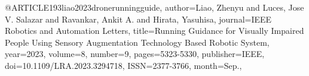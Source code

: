 @ARTICLE{193liao2023dronerunningguide,
author={Liao, Zhenyu and Luces, Jose V. Salazar and Ravankar, Ankit A. and Hirata, Yasuhisa},
journal={IEEE Robotics and Automation Letters}, 
title={Running Guidance for Visually Impaired People Using Sensory Augmentation Technology Based Robotic System}, 
year={2023},
volume={8},
number={9},
pages={5323-5330},
publisher={IEEE},
doi={10.1109/LRA.2023.3294718},
ISSN={2377-3766},
month={Sep.},}
